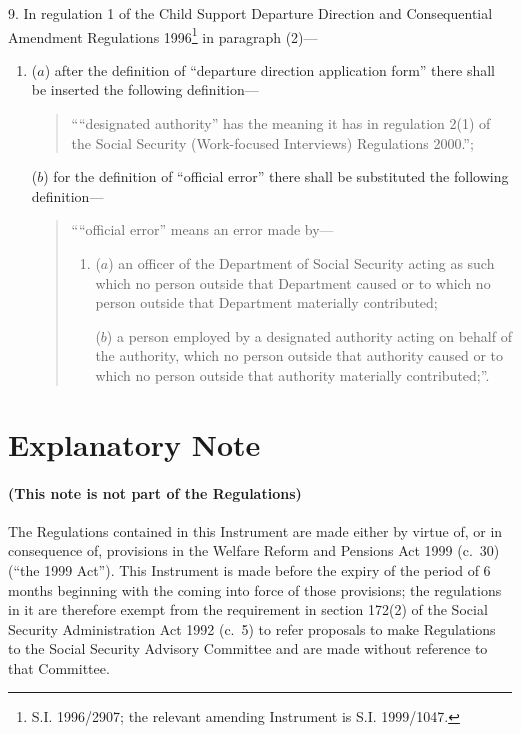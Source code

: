 \documentclass[12pt,a4paper]{article}
\begin{document}
9.  In regulation 1 of the Child Support Departure Direction and Consequential Amendment Regulations 1996\footnote{\frenchspacing S.I. 1996/2907; the relevant amending Instrument is S.I. 1999/1047.} in paragraph (2)—
\begin{enumerate}\item[]
($a$) after the definition of “departure direction application form” there shall be inserted the following definition—
\begin{quotation}
    ““designated authority” has the meaning it has in regulation 2(1) of the Social Security (Work-focused Interviews) Regulations 2000.”; 
\end{quotation}

($b$) for the definition of “official error” there shall be substituted the following definition—
\begin{quotation}
    ““official error” means an error made by—
\begin{enumerate}\item[]
    ($a$) 
    an officer of the Department of Social Security acting as such which no person outside that Department caused or to which no person outside that Department materially contributed;

    ($b$) 
    a person employed by a designated authority acting on behalf of the authority, which no person outside that authority caused or to which no person outside that authority materially contributed;”.
\end{enumerate}
\end{quotation}
\end{enumerate}

\part{Explanatory Note}

\renewcommand\parthead{— Explanatory Note}

\subsection*{(This note is not part of the Regulations)}

The Regulations contained in this Instrument are made either by virtue of, or in consequence of, provisions in the Welfare Reform and Pensions Act 1999 (c.\ 30) (“the 1999 Act”). This Instrument is made before the expiry of the period of 6 months beginning with the coming into force of those provisions; the regulations in it are therefore exempt from the requirement in section 172(2) of the Social Security Administration Act 1992 (c.\ 5) to refer proposals to make Regulations to the Social Security Advisory Committee and are made without reference to that Committee.
\end{document}
